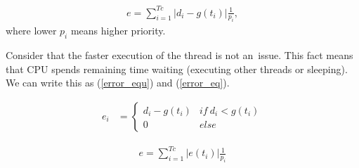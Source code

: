 \documentclass[a4paper, conference]{IEEEtran}
\begin{document}
\begin{align}
e = \sum_{i=1}^{Tc} |d_i - g(t_i)|\frac{1}{p_i} ,
\end{align}
where lower $p_i$ means higher priority.

Consider that the faster execution of the thread is not an~issue. This fact means that CPU spends remaining time waiting (executing other threads or sleeping). We can write this as  (\ref{error_equ})  and (\ref{error_eq}).

\begin{align}
\label{error_equ}
	 e_i &=
	  \begin{cases}
	   d_i - g(t_i) & if\ d_i < g(t_i) \\
	   0       & else
	  \end{cases}
\end{align}

\begin{align}
\label{error_eq}
e = \sum_{i=1}^{Tc} |e(t_i)|\frac{1}{p_i}
\end{align}
\end{document}
